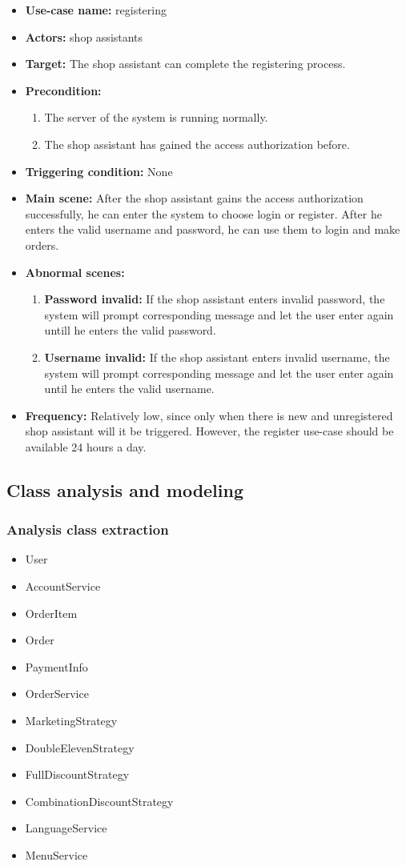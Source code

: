 \documentclass[a4paper]{report}
\begin{document}
 \begin{itemize}
\item \textbf{Use-case name:}  registering
\item \textbf{Actors:} shop assistants
\item \textbf{Target:} The shop assistant can complete the registering process.
\item \textbf{Precondition:} 
\begin{enumerate}
\item The server of the system is running normally.
\item The shop assistant has gained the access authorization before.
\end{enumerate}
\item \textbf{Triggering condition:} None
\item \textbf{Main scene:} After the shop assistant gains the access authorization successfully, he can enter the system to choose login or register. After he enters the valid username and password, he can use them to login and make orders.
\item \textbf{Abnormal scenes:} 
\begin{enumerate}
\item  \textbf{Password invalid:} If the shop assistant enters invalid password, the system will prompt corresponding message and let the user enter again untill he enters the valid password.
\item \textbf{Username invalid:} If the shop assistant enters invalid username, the system will prompt corresponding message and let the user enter again until he enters the valid username.
\end{enumerate}
\item \textbf{Frequency:}  Relatively low, since only when there is new and unregistered shop assistant will it be triggered. However, the register use-case should be available 24 hours a day. 
\end{itemize}

\subsection{Class analysis and modeling}
\subsubsection{Analysis class extraction}
\begin{itemize}
\item User
\item AccountService
\item OrderItem
\item Order
\item PaymentInfo
\item OrderService
\item MarketingStrategy
\item DoubleElevenStrategy
\item FullDiscountStrategy
\item CombinationDiscountStrategy
\item LanguageService
\item MenuService
\end{itemize}
\end{document}
